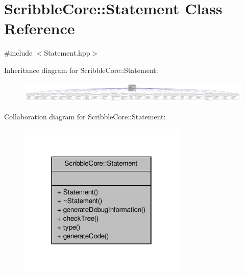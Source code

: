 \hypertarget{class_scribble_core_1_1_statement}{\section{Scribble\-Core\-:\-:Statement Class Reference}
\label{class_scribble_core_1_1_statement}
}


{\ttfamily \#include $<$Statement.\-hpp$>$}



Inheritance diagram for Scribble\-Core\-:\-:Statement\-:
\nopagebreak
\begin{figure}[H]
\begin{center}
\leavevmode
\includegraphics[width=350pt]{class_scribble_core_1_1_statement__inherit__graph}
\end{center}
\end{figure}


Collaboration diagram for Scribble\-Core\-:\-:Statement\-:
\nopagebreak
\begin{figure}[H]
\begin{center}
\leavevmode
\includegraphics[width=226pt]{class_scribble_core_1_1_statement__coll__graph}
\end{center}
\end{figure}
